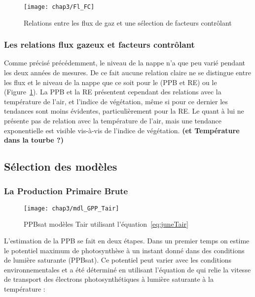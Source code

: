 \begin{figure}
\centering
\texttt{[image: chap3/Fl\_FC]}
\caption{Relations entre les flux de gaz et une sélection de facteurs contrôlant}
\label{fig:Fl_FC}
\end{figure}

\subsubsection{Les relations flux gazeux et facteurs contrôlant}

Comme précisé précédemment, le niveau de la nappe n'a que peu varié pendant les deux années de mesures.
De ce fait aucune relation claire ne se distingue entre les flux et le niveau de la nappe que ce soit pour le \coo (PPB et RE) ou le \chh (Figure~\ref{fig:Fl_FC}).
La PPB et la RE présentent cependant des relations avec la température de l'air, et l'indice de végétation, même si pour ce dernier les tendances sont moins évidentes, particulièrement pour la RE.
Le \chh quant à lui ne présente pas de relation avec la température de l'air, mais une tendance exponentielle est visible vis-à-vis de l'indice de végétation.
\textbf{(\chh et Température dans la tourbe ?)}

\subsection{Sélection des modèles}

\subsubsection{La Production Primaire Brute}

\begin{figure}
\centering
\texttt{[image: chap3/mdl\_GPP\_Tair]}
\caption{PPBsat modèles Tair utilisant l'équation~\ref{eq:juneTair}}
\label{fig:mdl_GPP_Tair}
\end{figure}

L'estimation de la PPB se fait en deux étapes.
Dans un premier temps on estime le potentiel maximum de photosynthèse à un instant donné dans des conditions de lumière saturante (PPBsat).
Ce potentiel peut varier avec les conditions environnementales et a été déterminé en utilisant l'équation de \citep{june2004} qui relie la vitesse de transport des électrons photosynthétiques à lumière saturante à la température :

